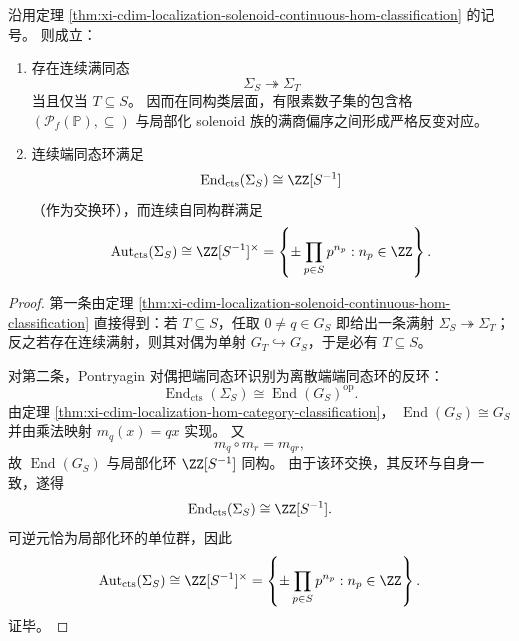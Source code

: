 \begin{corollary}\label{cor:xi-cdim-localization-solenoid-quotient-order-endomorphism}
沿用定理 \ref{thm:xi-cdim-localization-solenoid-continuous-hom-classification} 的记号。
则成立：
\begin{enumerate}
  \item 存在连续满同态
  \[
  \Sigma_S\twoheadrightarrow \Sigma_T
  \]
  当且仅当 \(T\subseteq S\)。
  因而在同构类层面，有限素数子集的包含格
  \(
  (\mathcal P_f(\mathbb P),\subseteq)
  \)
  与局部化 solenoid 族的满商偏序之间形成严格反变对应。
  \item 连续端同态环满足
  \[
  \operatorname{End}_{\mathrm{cts}}(\Sigma_S)\cong \ZZ[S^{-1}]
  \]
  （作为交换环），而连续自同构群满足
  \[
  \operatorname{Aut}_{\mathrm{cts}}(\Sigma_S)
  \cong
  \ZZ[S^{-1}]^\times
  =
  \left\{\pm\prod_{p\in S}p^{n_p}: n_p\in\ZZ\right\}.
  \]
\end{enumerate}
\end{corollary}
\begin{proof}
第一条由定理 \ref{thm:xi-cdim-localization-solenoid-continuous-hom-classification} 直接得到：若 \(T\subseteq S\)，任取 \(0\neq q\in G_S\) 即给出一条满射 \(\Sigma_S\twoheadrightarrow \Sigma_T\)；反之若存在连续满射，则其对偶为单射
\(
G_T\hookrightarrow G_S
\)，于是必有 \(T\subseteq S\)。

对第二条，Pontryagin 对偶把端同态环识别为离散端端同态环的反环：
\[
\operatorname{End}_{\mathrm{cts}}(\Sigma_S)\cong \operatorname{End}(G_S)^{\mathrm{op}}.
\]
由定理 \ref{thm:xi-cdim-localization-hom-category-classification}，
\(
\operatorname{End}(G_S)\cong G_S
\)
并由乘法映射 \(m_q(x)=qx\) 实现。
又
\[
m_q\circ m_r=m_{qr},
\]
故 \(\operatorname{End}(G_S)\) 与局部化环 \(\ZZ[S^{-1}]\) 同构。
由于该环交换，其反环与自身一致，遂得
\[
\operatorname{End}_{\mathrm{cts}}(\Sigma_S)\cong \ZZ[S^{-1}].
\]
可逆元恰为局部化环的单位群，因此
\[
\operatorname{Aut}_{\mathrm{cts}}(\Sigma_S)\cong \ZZ[S^{-1}]^\times
=
\left\{\pm\prod_{p\in S}p^{n_p}: n_p\in\ZZ\right\}.
\]
证毕。
\end{proof}

